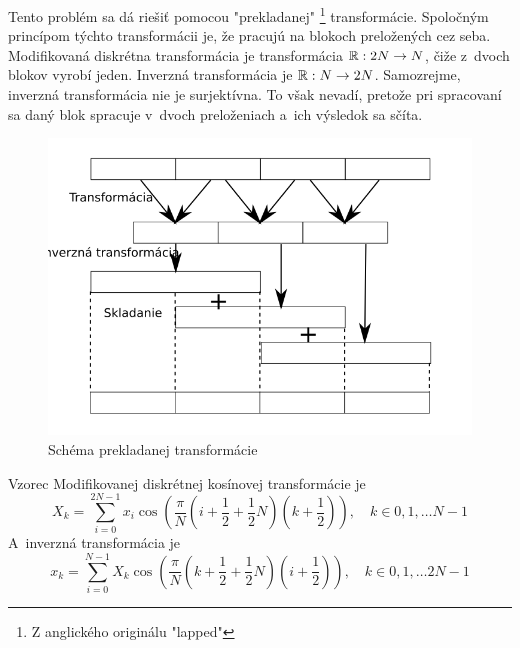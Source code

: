 Tento problém sa dá riešiť pomocou "prekladanej" \footnote{Z
anglického originálu "lapped"} transformácie. Spoločným princípom
týchto transformácii je, že pracujú na blokoch preložených cez seba.
Modifikovaná diskrétna transformácia je transformácia ${\mathbb R}: 2N \rightarrow
N$, čiže z~dvoch blokov vyrobí jeden. Inverzná transformácia je
${\mathbb R}: N \rightarrow 2N$. Samozrejme, inverzná transformácia nie je
surjektívna. To však nevadí, pretože pri spracovaní sa daný blok
spracuje v~dvoch preloženiach a~ich výsledok sa sčíta.
%
\begin{figure}[htp]
    \centering
    \includegraphics{obrazky/informatika/audio/lapped_transform}
    \caption{Schéma prekladanej transformácie}
    \label{fig:lapped_transform}
\end{figure}
%
Vzorec Modifikovanej diskrétnej kosínovej transformácie je
\begin{equation*}
  X_k = \sum_{i=0}^{2N-1} x_i 
            \cos(\frac{\pi}{N} (i + \frac{1}{2} + \frac{1}{2} N) (k +
            \frac{1}{2})),
            \quad k \in 0,1,\dots N-1
\end{equation*}
A~inverzná transformácia je
\begin{equation*}
  x_k = \sum_{i=0}^{N-1} X_k 
            \cos (\frac{\pi}{N} (k + \frac{1}{2} + \frac{1}{2} N) (i +
            \frac{1}{2})),
            \quad k \in 0,1,\dots 2N-1
\end{equation*}

